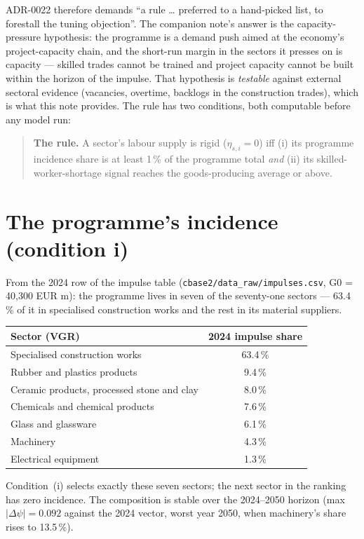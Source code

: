 \documentclass[11pt]{article}
\begin{document}
ADR-0022 therefore demands ``a rule \ldots{} preferred to a hand-picked
list, to forestall the tuning objection''. The companion note's answer is
the capacity-pressure hypothesis: the programme is a demand push aimed at
the economy's project-capacity chain, and the short-run margin in the
sectors it presses on is capacity --- skilled trades cannot be trained and
project capacity cannot be built within the horizon of the impulse. That
hypothesis is \emph{testable} against external sectoral evidence
(vacancies, overtime, backlogs in the construction trades), which is what
this note provides. The rule has two conditions, both computable before any
model run:

\begin{quote}\small
\textbf{The rule.} A sector's labour supply is rigid ($\eta_{s,i} = 0$)
iff (i) its programme incidence share is at least 1\,\% of the programme
total \emph{and} (ii) its skilled-worker-shortage signal reaches the
goods-producing average or above.
\end{quote}

\section{The programme's incidence (condition i)}\label{sec:incidence}

From the 2024 row of the impulse table (\texttt{cbase2/data\_raw/impulses.csv},
G0 = 40{,}300 EUR m): the programme lives in seven of the seventy-one
sectors --- 63.4\,\% of it in specialised construction works and the rest in
its material suppliers.

\begin{center}
\begin{tabular}{lc}
\toprule
Sector (VGR) & 2024 impulse share \\
\midrule
Specialised construction works & 63.4\,\% \\
Rubber and plastics products & 9.4\,\% \\
Ceramic products, processed stone and clay & 8.0\,\% \\
Chemicals and chemical products & 7.6\,\% \\
Glass and glassware & 6.1\,\% \\
Machinery & 4.3\,\% \\
Electrical equipment & 1.3\,\% \\
\bottomrule
\end{tabular}
\end{center}

Condition~(i) selects exactly these seven sectors; the next sector in the
ranking has zero incidence. The composition is stable over the 2024--2050
horizon (max $\lvert \Delta \psi \rvert = 0.092$ against the 2024 vector,
worst year 2050, when machinery's share rises to 13.5\,\%).
\end{document}
